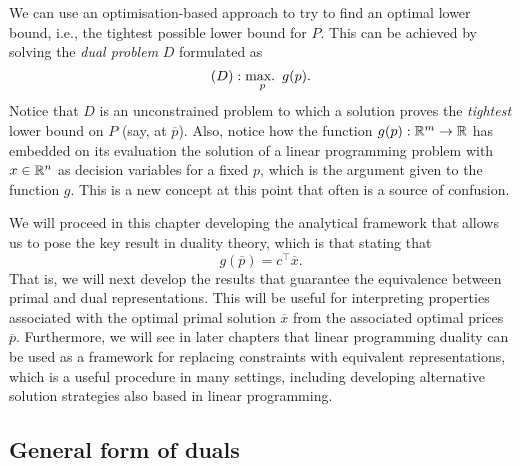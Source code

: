We can use an optimisation-based approach to try to find an optimal lower bound, i.e., the tightest possible lower bound for $P$. This can be achieved by solving the \emph{dual problem} $D$ formulated as 
%
\begin{equation*}
	(D) : \mathop{\text{max.~}}_p g(p).
\end{equation*}
%
Notice that $D$ is an unconstrained problem to which a solution proves the \emph{tightest} lower bound on $P$ (say, at $\overline{p}$). Also, notice how the function $g(p) : \mathbb{R}^m \to \mathbb{R}$ has embedded on its evaluation the solution of a linear programming problem with $x \in \mathbb{R}^n$ as decision variables for a fixed $p$, which is the argument given to the function $g$. This is a new concept at this point that often is a source of confusion. 

We will proceed in this chapter developing the analytical framework that allows us to pose the key result in duality theory, which is that stating that 
%
\begin{equation*}
	g(\overline{p}) = c^\top \overline{x}.	
\end{equation*}
%
That is, we will next develop the results that guarantee the equivalence between primal and dual representations. This will be useful for interpreting properties associated with the optimal primal solution $\overline{x}$ from the associated optimal prices $\overline{p}$. Furthermore, we will see in later chapters that linear programming duality can be used as a framework for replacing constraints with equivalent representations, which is a useful procedure in many settings, including developing alternative solution strategies also based in linear programming. 


\subsection{General form of duals}

